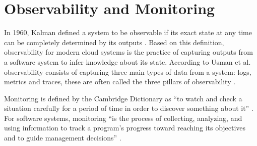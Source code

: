 \section{Observability and Monitoring}

In 1960, Kalman defined a system to be observable if its exact state at any time can be completely determined
by its outputs \cite{Ka60}. Based on this definition, observability
for modern cloud systems is the practice of capturing outputs from a software system to
infer knowledge about its state. According to Usman et al. observability consists of capturing
three main types of data from a system: logs, metrics and traces, these are often called the
three pillars of observability \cite{UF+22}.


Monitoring is defined by the Cambridge Dictionary as
\enquote{to watch and check a situation carefully for a period of time in order to discover something about it}
\cite{Cam-CAL}.
For software systems, monitoring 
\enquote{is the process of collecting, analyzing, and using information to track a program's progress toward reaching its objectives and to guide management decisions}
\cite{Ja23}.






